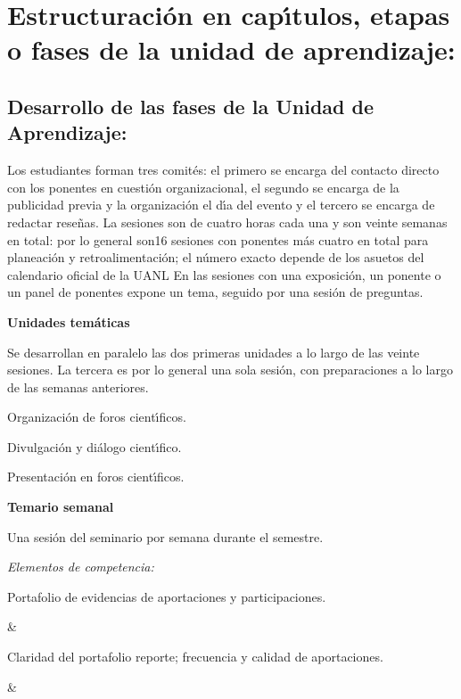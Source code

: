 \section{Estructuraci\'{o}n en cap\'{\i}tulos, etapas o fases de la unidad de
  aprendizaje:}

\subsection{Desarrollo de las fases de la Unidad de Aprendizaje:}

Los estudiantes forman tres comit\'{e}s: el primero se encarga del
contacto directo con los ponentes en cuesti\'{o}n organizacional, el
segundo se encarga de la publicidad previa y la organizaci\'{o}n el
d\'{\i}a del evento y el tercero se encarga de redactar rese\~{n}as.
La sesiones son de cuatro horas cada una y son veinte semanas en
total: por lo general son16 sesiones con ponentes m\'{a}s cuatro en
total para planeaci\'{o}n y retroalimentaci\'{o}n; el n\'{u}mero exacto
depende de los asuetos del calendario oficial de la UANL En las
sesiones con una exposici\'{o}n, un ponente o un panel de ponentes
expone un tema, seguido por una sesi\'{o}n de preguntas.

{\bf Unidades tem\'{a}ticas}

Se desarrollan en paralelo las dos primeras unidades a lo largo de las
veinte sesiones. La tercera es por lo general una sola sesi\'{o}n, con
preparaciones a lo largo de las semanas anteriores.

\begin{description}[itemsep=-2pt]
\item[U1]{Organizaci\'{o}n de foros cient\'{\i}ficos.}
\item[U2]{Divulgaci\'{o}n y di\'{a}logo cient\'{\i}fico.}
\item[U3]{Presentaci\'{o}n en foros cient\'{\i}ficos.}
\end{description}

{\bf Temario semanal}

Una sesi\'{o}n del seminario por semana durante el semestre.


{\em Elementos de competencia:}



Portafolio de evidencias de aportaciones y participaciones.

&

Claridad del portafolio reporte; frecuencia y calidad de aportaciones.

&

